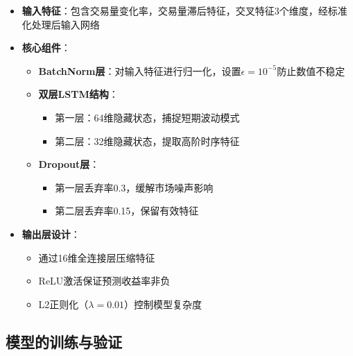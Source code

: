 \documentclass[a4paper,11pt]{ctexart}
\begin{document}
\begin{itemize}
\item \textbf{输入特征}：包含交易量变化率，交易量滞后特征，交叉特征3个维度，经标准化处理后输入网络

\item \textbf{核心组件}：
  \begin{itemize}
  \item \textbf{BatchNorm层}：对输入特征进行归一化，设置$\epsilon=10^{-5}$防止数值不稳定
  \item \textbf{双层LSTM结构}：
    \begin{itemize}
    \item 第一层：64维隐藏状态，捕捉短期波动模式
    \item 第二层：32维隐藏状态，提取高阶时序特征
    \end{itemize}
  \item \textbf{Dropout层}：
    \begin{itemize}
    \item 第一层丢弃率0.3，缓解市场噪声影响
    \item 第二层丢弃率0.15，保留有效特征
    \end{itemize}
  \end{itemize}

\item \textbf{输出层设计}：
  \begin{itemize}
  \item 通过16维全连接层压缩特征
  \item ReLU激活保证预测收益率非负
  \item L2正则化（$\lambda=0.01$）控制模型复杂度
  \end{itemize}
\end{itemize}





\subsection{模型的训练与验证}
\end{document}
